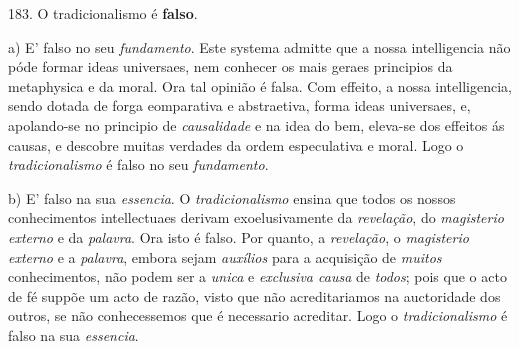 183. O tradicionalismo é \textbf{falso}.

a) E' falso no seu \emph{fundamento}. Este systema admitte que a nossa intelligencia não póde formar ideas universaes, nem conhecer os mais geraes principios da metaphysica e da moral. Ora tal opinião é falsa. Com effeito, a nossa intelligencia, sendo dotada de forga eomparativa e abstraetiva, forma ideas universaes, e, apolando-se no principio de \emph{causalidade} e na idea do bem, eleva-se dos effeitos ás causas, e descobre muitas verdades da ordem especulativa e moral. Logo o \emph{tradicionalismo} é falso no seu \emph{fundamento}.

b) E' falso na sua \emph{essencia}. O \emph{tradicionalismo} ensina que   todos os nossos conhecimentos intellectuaes derivam exoelusivamente da \emph{revelação}, do \emph{magisterio externo} e da \emph{palavra}. Ora isto é falso. Por quanto, a \emph{revelação}, o \emph{magisterio externo} e a \emph{palavra}, embora sejam \emph{auxílios} para a acquisição de \emph{muitos} conhecimentos, não podem ser a \emph{unica} e \emph{exclusiva causa} de \emph{todos}; pois que o acto de fé suppõe um acto de razão, visto que não acreditariamos na auctoridade dos outros, se não conhecessemos que é necessario acreditar. Logo o \emph{tradicionalismo} é falso na sua \emph{essencia}.

